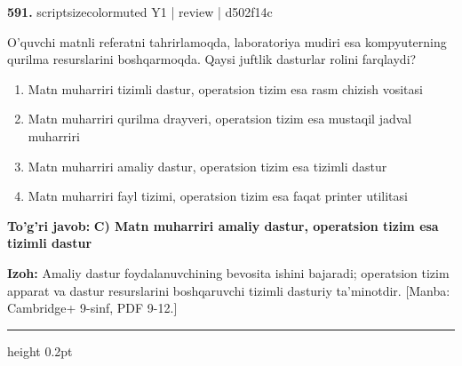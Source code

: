 \documentclass[10pt,a4paper]{article}
\begin{document}
{\bfseries\sffamily\color{ink} 591.} {scriptsizecolor{muted} Y1 | review | d502f14c}
\par
O'quvchi matnli referatni tahrirlamoqda, laboratoriya mudiri esa kompyuterning qurilma resurslarini boshqarmoqda. Qaysi juftlik dasturlar rolini farqlaydi?
\begin{enumerate}[label=\Alph*),leftmargin=9mm]
\item Matn muharriri tizimli dastur, operatsion tizim esa rasm chizish vositasi
\item Matn muharriri qurilma drayveri, operatsion tizim esa mustaqil jadval muharriri
\item Matn muharriri amaliy dastur, operatsion tizim esa tizimli dastur
\item Matn muharriri fayl tizimi, operatsion tizim esa faqat printer utilitasi
\end{enumerate}
\begin{tcolorbox}[enhanced,breakable,colback=teal!4,colframe=teal!60!black,boxrule=0.45pt,arc=1.2mm,left=2.7mm,right=2.7mm,top=1.8mm,bottom=1.8mm,before skip=2mm,after skip=2mm]
{\bfseries\sffamily\color{teal}To'g'ri javob:} \textbf{C) Matn muharriri amaliy dastur, operatsion tizim esa tizimli dastur}
\par\smallskip
{\bfseries Izoh:} Amaliy dastur foydalanuvchining bevosita ishini bajaradi; operatsion tizim apparat va dastur resurslarini boshqaruvchi tizimli dasturiy ta'minotdir. [Manba: Cambridge+ 9-sinf, PDF 9-12.]
\end{tcolorbox}
\vspace{2mm}\hrule height 0.2pt\vspace{3mm}
\end{document}
